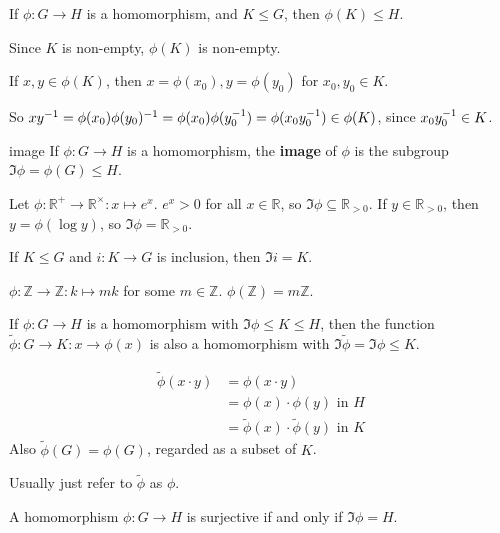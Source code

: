 \begin{prop}
If $\phi:G\to H$ is a homomorphism, and $K\le G$, then $\phi(K)\le H$.
\end{prop}

\begin{pf}
Since $K$ is non-empty, $\phi(K)$ is non-empty.

If $x,y\in\phi(K)$, then $x=\phi(x_0), y=\phi(y_0)$ for $x_0,y_0\in K$.

So $xy^{-1}=\phi(x_0)\phi(y_0)^{-1}=\phi(x_0)\phi(y_0^{-1})=\phi(x_0y_0^{-1})\in\phi(K)$, since $x_0y_0^{-1}\in K$.
\end{pf}

\begin{defn}{image}
If $\phi:G\to H$ is a homomorphism, the \textbf{image} of $\phi$ is the subgroup $\Im \phi = \phi(G)\le H$.
\end{defn}

\begin{ex}
Let $\phi:\mathbb R^+\to \mathbb R^\times: x\mapsto e^x$. $e^x>0$ for all $x\in \mathbb R$, so $\Im \phi \subseteq \mathbb R_{>0}$. If $y\in\mathbb R_{>0}$, then $y=\phi(\log y)$, so $\Im \phi = \mathbb R_{>0}$.

If $K\le G$ and $i:K\to G$ is inclusion, then $\Im i=K$.

$\phi:\mathbb Z\to \mathbb Z: k\mapsto mk$ for some $m\in \mathbb Z$. $\phi(\mathbb Z)=m\mathbb Z$.

\end{ex}

\begin{lemma}
If $\phi:G\to H$ is a homomorphism with $\Im \phi \le K \le H$, then the function $\tilde{ \phi} : G\to K: x\to \phi(x)$ is also a homomorphism with $\Im\tilde{ \phi} = \Im \phi \le K$.
\end{lemma}

\begin{pf}
$$
\begin{aligned}
\tilde{ \phi}(x\cdot y) &=\phi(x\cdot y)\\
&= \phi(x)\cdot \phi(y) \text{ in } H\\
&=\tilde{ \phi}(x)\cdot \tilde{ \phi}(y) \text{ in } K
\end{aligned}
$$
Also $\tilde{ \phi}(G)=\phi(G)$, regarded as a subset of $K$.
\end{pf}
Usually just refer to $\tilde{ \phi}$ as $\phi$.

\begin{lemma}
A homomorphism $\phi:G\to H$ is surjective if and only if $\Im\phi = H$.
\end{lemma}

